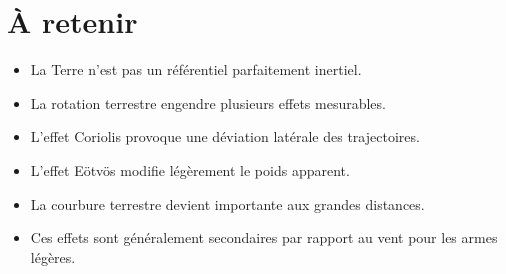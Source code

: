 \section{À retenir}

\begin{aretenir}

\begin{itemize}
    \item La Terre n'est pas un référentiel parfaitement inertiel.
    \item La rotation terrestre engendre plusieurs effets mesurables.
    \item L'effet Coriolis provoque une déviation latérale des trajectoires.
    \item L'effet Eötvös modifie légèrement le poids apparent.
    \item La courbure terrestre devient importante aux grandes distances.
    \item Ces effets sont généralement secondaires par rapport au vent pour
    les armes légères.
\end{itemize}

\end{aretenir}
